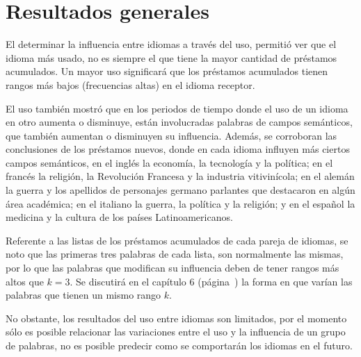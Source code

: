 \section{Resultados generales} %


El determinar la influencia entre idiomas a través del uso, permitió ver  que el idioma más usado, no es siempre el que tiene la mayor cantidad de préstamos acumulados.  Un mayor uso significará que los préstamos acumulados tienen rangos más bajos (frecuencias altas) en el idioma receptor.

El uso también mostró que en los periodos de tiempo donde el uso de un idioma en otro aumenta o disminuye, están involucradas palabras de campos semánticos, que también aumentan o disminuyen su influencia.  Además, se corroboran las conclusiones de los préstamos nuevos, donde en cada idioma influyen más ciertos campos semánticos, en el inglés la economía, la tecnología y la política; en el francés la religión, la Revolución Francesa y la industria vitivinícola; en el alemán la guerra y los apellidos de personajes germano parlantes que destacaron en algún área académica; en el italiano la guerra, la política y la religión; y en el español la medicina y la cultura de los países Latinoamericanos.

Referente a las listas de los préstamos acumulados de cada pareja de idiomas, se noto que las primeras tres palabras de cada lista, son normalmente las mismas, por lo que las palabras que modifican su influencia deben de tener rangos más altos que $k=3$. Se discutirá en el capítulo 6 (página~\pageref{cap.diversidad}) la forma en que varían las palabras que tienen un mismo rango $k$.

No obstante, los resultados del uso entre idiomas son limitados, por el momento sólo es posible relacionar las variaciones entre el uso y la influencia de un grupo de palabras, no es posible predecir como se comportarán los idiomas en el futuro. 



 


